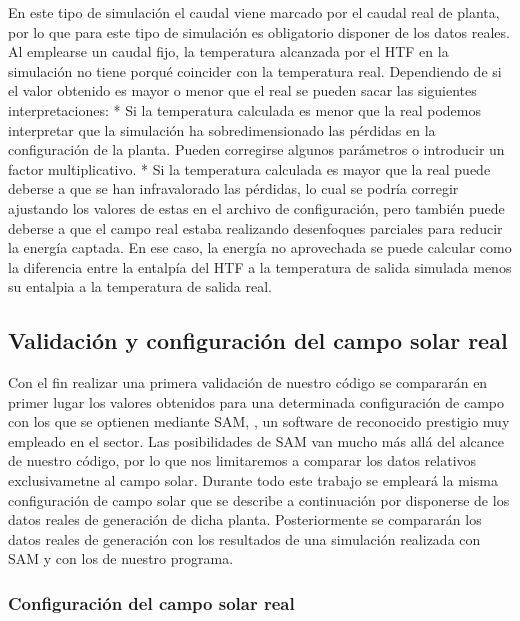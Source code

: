 \documentclass[11pt]{article}
\begin{document}
En este tipo de simulación el caudal viene marcado por el caudal real de
planta, por lo que para este tipo de simulación es obligatorio disponer
de los datos reales. Al emplearse un caudal fijo, la temperatura
alcanzada por el HTF en la simulación no tiene porqué coincider con la
temperatura real. Dependiendo de si el valor obtenido es mayor o menor
que el real se pueden sacar las siguientes interpretaciones: * Si la
temperatura calculada es menor que la real podemos interpretar que la
simulación ha sobredimensionado las pérdidas en la configuración de la
planta. Pueden corregirse algunos parámetros o introducir un factor
multiplicativo. * Si la temperatura calculada es mayor que la real puede
deberse a que se han infravalorado las pérdidas, lo cual se podría
corregir ajustando los valores de estas en el archivo de configuración,
pero también puede deberse a que el campo real estaba realizando
desenfoques parciales para reducir la energía captada. En ese caso, la
energía no aprovechada se puede calcular como la diferencia entre la
entalpía del HTF a la temperatura de salida simulada menos su entalpia a
la temperatura de salida real.

    \hypertarget{validaciuxf3n-y-configuraciuxf3n-del-campo-solar-real}{%
\subsection{Validación y configuración del campo solar
real}\label{validaciuxf3n-y-configuraciuxf3n-del-campo-solar-real}}

Con el fin realizar una primera validación de nuestro código se
compararán en primer lugar los valores obtenidos para una determinada
configuración de campo con los que se optienen mediante SAM,
\cite{1022085/NBJ6NM3F}, un software de reconocido prestigio muy
empleado en el sector. Las posibilidades de SAM van mucho más allá del
alcance de nuestro código, por lo que nos limitaremos a comparar los
datos relativos exclusivametne al campo solar. Durante todo este trabajo
se empleará la misma configuración de campo solar que se describe a
continuación por disponerse de los datos reales de generación de dicha
planta. Posteriormente se compararán los datos reales de generación con
los resultados de una simulación realizada con SAM y con los de nuestro
programa.

\hypertarget{configuraciuxf3n-del-campo-solar-real}{%
\subsubsection{Configuración del campo solar
real}\label{configuraciuxf3n-del-campo-solar-real}}
\end{document}

